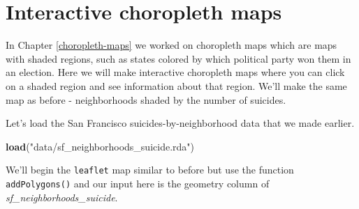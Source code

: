 \documentclass[
  12pt,
]{book}
\newenvironment{Shaded}{\begin{snugshade}}{\end{snugshade}}
\newcommand{\CommentTok}[1]{\textcolor[rgb]{0.56,0.35,0.01}{\textit{#1}}}
\newcommand{\DataTypeTok}[1]{\textcolor[rgb]{0.13,0.29,0.53}{#1}}
\newcommand{\KeywordTok}[1]{\textcolor[rgb]{0.13,0.29,0.53}{\textbf{#1}}}
\newcommand{\NormalTok}[1]{#1}
\newcommand{\OperatorTok}[1]{\textcolor[rgb]{0.81,0.36,0.00}{\textbf{#1}}}
\newcommand{\StringTok}[1]{\textcolor[rgb]{0.31,0.60,0.02}{#1}}
\begin{document}
\hypertarget{interactive-choropleth-maps}{%
\section{Interactive choropleth maps}\label{interactive-choropleth-maps}}

In Chapter \ref{choropleth-maps} we worked on choropleth maps which are maps with shaded regions, such as states colored by which political party won them in an election. Here we will make interactive choropleth maps where you can click on a shaded region and see information about that region. We'll make the same map as before - neighborhoods shaded by the number of suicides.

Let's load the San Francisco suicides-by-neighborhood data that we made earlier.

\begin{Shaded}
\begin{Highlighting}[]
\KeywordTok{load}\NormalTok{(}\StringTok{"data/sf\_neighborhoods\_suicide.rda"}\NormalTok{)}
\end{Highlighting}
\end{Shaded}

We'll begin the \texttt{leaflet} map similar to before but use the function \texttt{addPolygons()} and our input here is the geometry column of \emph{sf\_neighborhoods\_suicide}.

\begin{Shaded}
\end{Shaded}
\end{document}
